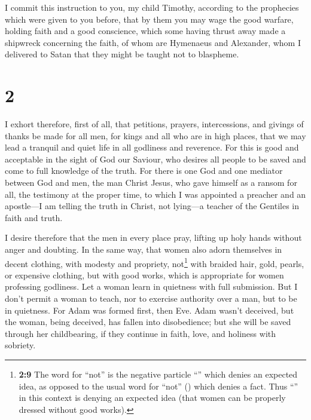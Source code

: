  I commit this instruction to you, my child Timothy,
according to the prophecies which were given to you before, that by them
you may wage the good warfare,  holding faith and a good
conscience, which some having thrust away made a shipwreck concerning
the faith,  of whom are Hymenaeus and Alexander, whom I
delivered to Satan that they might be taught not to blaspheme.

\hypertarget{section-1}{%
\section{2}\label{section-1}}

 I exhort therefore, first of all, that petitions,
prayers, intercessions, and givings of thanks be made for all men,
 for kings and all who are in high places, that we may
lead a tranquil and quiet life in all godliness and reverence.
 For this is good and acceptable in the sight of God our
Saviour,  who desires all people to be saved and come to
full knowledge of the truth.  For there is one God and one
mediator between God and men, the man Christ Jesus,  who
gave himself as a ransom for all, the testimony at the proper time,
 to which I was appointed a preacher and an apostle---I am
telling the truth in Christ, not lying---a teacher of the Gentiles in
faith and truth.

 I desire therefore that the men in every place pray,
lifting up holy hands without anger and doubting.  In the
same way, that women also adorn themselves in decent clothing, with
modesty and propriety, not\footnote{\textbf{2:9} The word for ``not'' is
  the negative particle ``'' which denies an expected idea, as
  opposed to the usual word for ``not'' () which denies a
  fact. Thus ``'' in this context is denying an expected idea
  (that women can be properly dressed without good works).} with braided
hair, gold, pearls, or expensive clothing,  but with good
works, which is appropriate for women professing godliness.
 Let a woman learn in quietness with full submission.
 But I don't permit a woman to teach, nor to exercise
authority over a man, but to be in quietness.  For Adam
was formed first, then Eve.  Adam wasn't deceived, but
the woman, being deceived, has fallen into disobedience; 
but she will be saved through her childbearing, if they continue in
faith, love, and holiness with sobriety.

